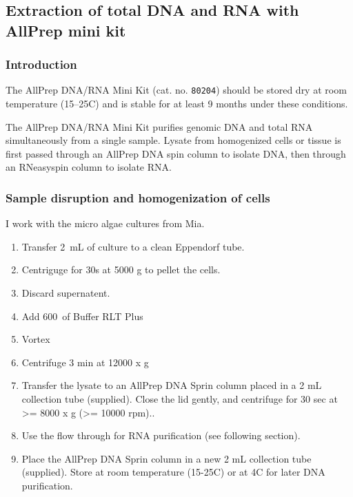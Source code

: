 \subsection{Extraction of total DNA and RNA with AllPrep mini kit}
\label{task:20180207_cj0}

\subsubsection{Introduction}

The AllPrep DNA/RNA Mini Kit (cat. no. \texttt{80204}) should be stored dry at room temperature (15–25\degree C) and is stable for at least 9 months under these conditions.

The AllPrep DNA/RNA Mini Kit purifies genomic DNA and total RNA simultaneously from a single sample. Lysate from homogenized cells or tissue is first passed through an AllPrep DNA spin column to isolate DNA, then through an RNeasy\cR spin column to isolate RNA.

\subsubsection{Sample disruption and homogenization of cells}

I work with the micro algae cultures from Mia. 
\begin{enumerate}
\item Transfer 2~mL of culture to a clean Eppendorf tube.
\item Centriguge for 30s at 5000 g to pellet the cells.
\item Discard supernatent.
\item Add 600~\uL of Buffer RLT Plus
\item Vortex
\item Centrifuge 3 min at 12000 x g
\item Transfer the lysate to an AllPrep DNA Sprin column placed in a 2 mL collection tube (supplied). Close the lid gently, and centrifuge for 30 sec at >= 8000 x g (>= 10000 rpm)..
\item Use the flow through for RNA purification (see following section).
\item Place the AllPrep DNA Sprin column in a new 2 mL collection tube (supplied). Store at room temperature (15-25\degree C) or at 4\degree C for later DNA purification. 
\end{enumerate}

